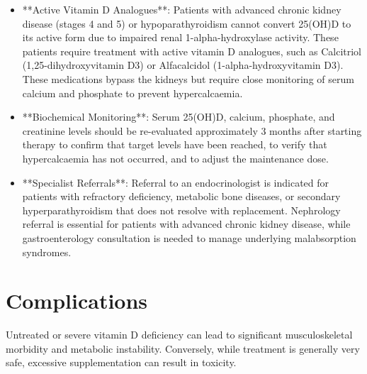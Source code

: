 \begin{itemize}
    \item **Active Vitamin D Analogues**: Patients with advanced chronic kidney disease (stages 4 and 5) or hypoparathyroidism cannot convert 25(OH)D to its active form due to impaired renal 1-alpha-hydroxylase activity. These patients require treatment with active vitamin D analogues, such as Calcitriol (1,25-dihydroxyvitamin D3) or Alfacalcidol (1-alpha-hydroxyvitamin D3). These medications bypass the kidneys but require close monitoring of serum calcium and phosphate to prevent hypercalcaemia.
    \item **Biochemical Monitoring**: Serum 25(OH)D, calcium, phosphate, and creatinine levels should be re-evaluated approximately 3 months after starting therapy to confirm that target levels have been reached, to verify that hypercalcaemia has not occurred, and to adjust the maintenance dose.
    \item **Specialist Referrals**: Referral to an endocrinologist is indicated for patients with refractory deficiency, metabolic bone diseases, or secondary hyperparathyroidism that does not resolve with replacement. Nephrology referral is essential for patients with advanced chronic kidney disease, while gastroenterology consultation is needed to manage underlying malabsorption syndromes.
\end{itemize}

\section*{Complications}
Untreated or severe vitamin D deficiency can lead to significant musculoskeletal morbidity and metabolic instability. Conversely, while treatment is generally very safe, excessive supplementation can result in toxicity.

